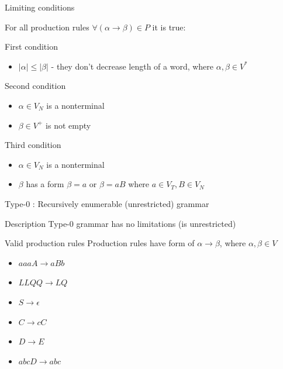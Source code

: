 \documentclass{beamer}
\begin{document}
\begin{frame}{Limiting conditions}

For all production rules $\forall (\alpha \rightarrow \beta)\in P$ it is true:

\begin{block}{First condition}
	\begin{itemize}
		\item $|\alpha| \leq |\beta|$ - they don't decrease length of a word, where $\alpha, \beta\in V^*$
	\end{itemize}

\end{block}

\begin{block}{Second condition}
	\begin{itemize}
		\item $\alpha\in V_N$ is a nonterminal
		\item $\beta\in V^{+}$ is not empty
	\end{itemize}
\end{block}

\begin{block}{Third condition}
	\begin{itemize}
		\item $\alpha\in V_N$ is a nonterminal
		\item $\beta$ has a form $\beta=a$ or $\beta=aB$ where $a\in V_T, B\in V_N$
	\end{itemize}
\end{block}

\end{frame}


\begin{frame}{Type-0 : Recursively enumerable (unrestricted) grammar}
	
	\begin{block}{Description}
		Type-0 grammar has no limitations (is unrestricted)
	\end{block}
	
	\begin{exampleblock}{Valid production rules}
		Production rules have form of $\alpha\rightarrow\beta$, where $\alpha, \beta\in V$
		\begin{itemize}
			\item $aaaA\rightarrow aBb$
			\item $LLQQ\rightarrow LQ$
			\item $S\rightarrow\epsilon$
			\item $C\rightarrow cC$
			\item $D\rightarrow E$
			\item $abcD\rightarrow abc$
		\end{itemize}
	\end{exampleblock}
\end{frame}
\end{document}
